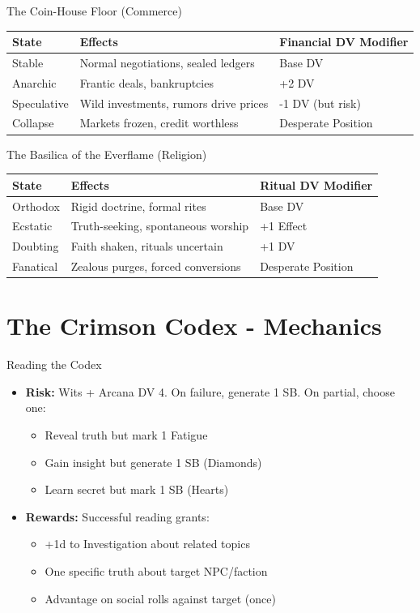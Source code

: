 \documentclass[11pt]{article}
\begin{document}
\begin{mechanicsbox}{The Coin-House Floor (Commerce)}
\begin{longtable}{p{}p{}p{}}
    \textbf{State} & \textbf{Effects} & \textbf{Financial DV Modifier} \\
    \hline
    Stable & Normal negotiations, sealed ledgers & Base DV \\
    Anarchic & Frantic deals, bankruptcies & +2 DV \\
    Speculative & Wild investments, rumors drive prices & -1 DV (but risk) \\
    Collapse & Markets frozen, credit worthless & Desperate Position \\
\end{longtable}
\end{mechanicsbox}

\begin{mechanicsbox}{The Basilica of the Everflame (Religion)}
\begin{longtable}{p{}p{}p{}}
    \textbf{State} & \textbf{Effects} & \textbf{Ritual DV Modifier} \\
    \hline
    Orthodox & Rigid doctrine, formal rites & Base DV \\
    Ecstatic & Truth-seeking, spontaneous worship & +1 Effect \\
    Doubting & Faith shaken, rituals uncertain & +1 DV \\
    Fanatical & Zealous purges, forced conversions & Desperate Position \\
\end{longtable}
\end{mechanicsbox}

\section*{The Crimson Codex - Mechanics}

\begin{mechanicsbox}{Reading the Codex}
\begin{itemize}
    \item \textbf{Risk:} Wits + Arcana DV 4. On failure, generate 1 SB. On partial, choose one:
    \begin{itemize}
        \item Reveal truth but mark 1 Fatigue
        \item Gain insight but generate 1 SB (Diamonds)
        \item Learn secret but mark 1 SB (Hearts)
    \end{itemize}
    \item \textbf{Rewards:} Successful reading grants:
    \begin{itemize}
        \item +1d to Investigation about related topics
        \item One specific truth about target NPC/faction
        \item Advantage on social rolls against target (once)
    \end{itemize}
\end{itemize}
\end{mechanicsbox}
\end{document}

